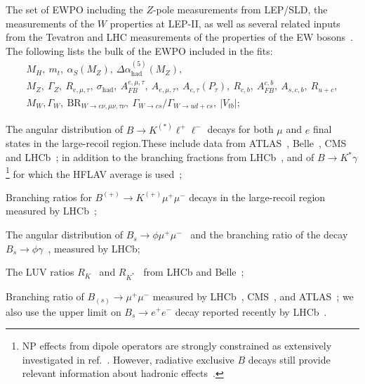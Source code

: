 \begin{itemize}
	\setlength\itemsep{0em}
	{\item The set of EWPO including the $Z$-pole measurements from LEP/SLD, the measurements of the $W$ properties at LEP-II, as well as several related inputs from the Tevatron and LHC measurements of the properties of the EW bosons~\cite{ALEPH:2005ab,Abe:2000uc,Group:2012gb,Schael:2013ita,Aaboud:2017svj,Khachatryan:2014iya,Abazov:2011ws}. The following lists the bulk of the EWPO included in the fits:
		\begin{gather*}
			M_H,~m_t,~\alpha_S(M_Z),~\Delta \alpha_{\mathrm{had}}^{(5)}(M_Z),\\
			M_{Z},~\Gamma_{Z},~R_{e,\mu,\tau},~\sigma_{\mathrm{had}}, ~A^{e,\mu,\tau}_{FB},~A_{e,\mu,\tau},~A_{e,\tau}(P_\tau),~ R_{c,b},~A^{c,b}_{FB},~A_{s,c,b},~R_{u+c}, \\
			M_{W},\Gamma_{W},~\mathrm{BR}_{W\to e \nu,\mu \nu,\tau \nu},~\Gamma_{W\to cs}/\Gamma_{W\to ud+cs},~\left|V_{tb}\right|;
		\end{gather*}
	}
	\item The angular distribution of $B\to K^{(*)}\ell^+\ell^-$ decays for both $\mu$ and $e$ final states in the large-recoil region.These include data from ATLAS~\cite{Aaboud:2018krd}, Belle~\cite{Wehle:2016yoi}, CMS~\cite{Khachatryan:2015isa,Sirunyan:2017dhj} and LHCb~\cite{Aaij:2015dea,Aaij:2020nrf}; in addition to the branching fractions from LHCb~\cite{Aaij:2016flj}, and of $B\to K^*\gamma$\footnote{NP effects from dipole operators are strongly constrained as extensively investigated in ref.~\cite{Paul:2016urs}. However, radiative exclusive $B$ decays still provide relevant information about hadronic effects~\cite{Ciuchini:2018anp}.} for which the HFLAV average is used~\cite{Amhis:2019ckw}; 
	\item Branching ratios for $B^{(+)} \to K^{(+)} \mu^+\mu^-$ decays in the large-recoil region measured by LHCb~\cite{Aaij:2014pli};
	\item The angular distribution of $B_s\to \phi\mu^+\mu^-$~\cite{Aaij:2015esa} and the branching ratio of  the decay $B_s\to\phi\gamma$~\cite{Aaij:2012ita}, measured by LHCb;
	\item The LUV ratios $R_K$~\cite{Aaij:2019wad} and $R_{K^*}$~\cite{Aaij:2017vbb} from LHCb and Belle~\cite{Abdesselam:2019wac};
	\item Branching ratio of $B_{(s)}\to \mu^+\mu^-$ measured by LHCb~\cite{Aaij:2017vad}, CMS~\cite{Chatrchyan:2013bka}, and ATLAS~\cite{Aaboud:2018mst}; we also use the upper limit on $B_s\to e^+e^-$ decay reported recently by LHCb~\cite{Aaij:2020nol}. 
\end{itemize}
